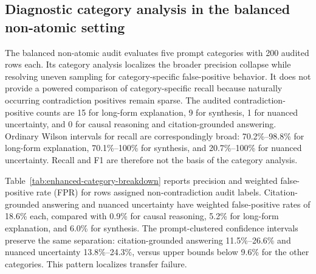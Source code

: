 \documentclass[11pt]{article}
\begin{document}
\subsection*{Diagnostic category analysis in the balanced non-atomic setting}
The balanced non-atomic audit evaluates five prompt categories with 200 audited rows each. Its category analysis localizes the broader precision collapse while resolving uneven sampling for category-specific false-positive behavior. It does not provide a powered comparison of category-specific recall because naturally occurring contradiction positives remain sparse. The audited contradiction-positive counts are 15 for long-form explanation, 9 for synthesis, 1 for nuanced uncertainty, and 0 for causal reasoning and citation-grounded answering. Ordinary Wilson intervals for recall are correspondingly broad: 70.2\%--98.8\% for long-form explanation, 70.1\%--100\% for synthesis, and 20.7\%--100\% for nuanced uncertainty. Recall and F1 are therefore not the basis of the category analysis.

Table~\ref{tab:enhanced-category-breakdown} reports precision and weighted false-positive rate (FPR) for rows assigned non-contradiction audit labels. Citation-grounded answering and nuanced uncertainty have weighted false-positive rates of 18.6\% each, compared with 0.9\% for causal reasoning, 5.2\% for long-form explanation, and 6.0\% for synthesis. The prompt-clustered confidence intervals preserve the same separation: citation-grounded answering 11.5\%--26.6\% and nuanced uncertainty 13.8\%--24.3\%, versus upper bounds below 9.6\% for the other categories. This pattern localizes transfer failure.
\end{document}
